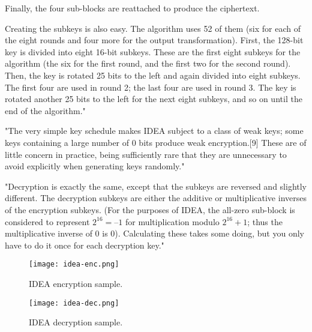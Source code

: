 \documentclass[a4paper,12pt,titlepage]{article}
\begin{document}
Finally, the four sub-blocks are reattached to produce the ciphertext.

Creating the subkeys is also easy. The algorithm uses 52 of them (six for each of the eight rounds and four more for the output transformation). First, the 128-bit key is divided into eight 16-bit subkeys. These are the first eight subkeys for the algorithm (the six for the first round, and the first two for the second round). Then, the key is rotated 25 bits to the left and again divided into eight subkeys. The first four are used in round 2; the last four are used in round 3. The key is rotated another 25 bits to the left for the next eight subkeys, and so on until the end of the algorithm." \citep{schneier_applied_1996}

"The very simple key schedule makes IDEA subject to a class of weak keys; some keys containing a large number of 0 bits produce weak encryption.[9] These are of little concern in practice, being sufficiently rare that they are unnecessary to avoid explicitly when generating keys randomly." \citep{wiki:idea}

"Decryption is exactly the same, except that the subkeys are reversed and slightly different. The decryption subkeys are either the additive or multiplicative inverses of the encryption subkeys. (For the purposes of IDEA, the all-zero sub-block is considered to represent $2^16 = –1$ for multiplication 
modulo $2^{16} + 1$; thus the multiplicative inverse of 0 is 0). Calculating these takes some doing, but you only have to do it once for each decryption key." \citep{schneier_applied_1996}

\begin{figure}[!ht]
	\centering
	\label{fig:idea-enc}
	\texttt{[image: idea-enc.png]}
	\caption{IDEA encryption sample. \citep{menezes_handbook_1996}}
\end{figure}

\begin{figure}[!ht]
	\centering
	\label{fig:idea-dec}
	\texttt{[image: idea-dec.png]}
	\caption{IDEA decryption sample. \citep{menezes_handbook_1996}}
\end{figure}

\newpage


\end{document}
